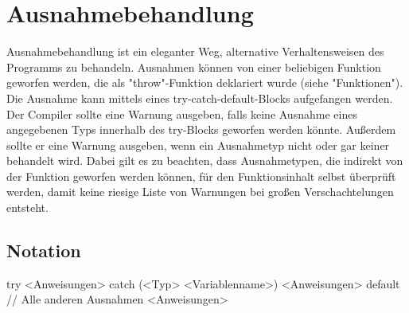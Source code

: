 \chapter{Ausnahmebehandlung}
Ausnahmebehandlung ist ein eleganter Weg, alternative Verhaltensweisen des Programms zu behandeln.
Ausnahmen können von einer beliebigen Funktion geworfen werden, die als "throw"-Funktion deklariert wurde (siehe "Funktionen").
Die Ausnahme kann mittels eines try-catch-default-Blocks aufgefangen werden.
Der Compiler sollte eine Warnung ausgeben, falls keine Ausnahme eines angegebenen Typs innerhalb des try-Blocks geworfen werden
könnte.
Außerdem sollte er eine Warnung ausgeben, wenn ein Ausnahmetyp nicht oder gar keiner behandelt wird. Dabei gilt es zu beachten, dass
Ausnahmetypen, die indirekt von der Funktion geworfen werden können, für den Funktionsinhalt selbst überprüft werden, damit keine
riesige Liste von Warnungen bei großen Verschachtelungen entsteht.

\section{Notation}
try
	<Anweisungen>
catch (<Typ> <Variablenname>)
	<Anweisungen>
default // Alle anderen Ausnahmen
	<Anweisungen>